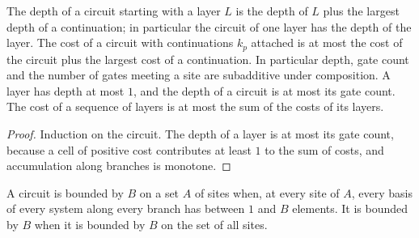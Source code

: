 \begin{theorem}
    \label{thm:circuits_cost_subadditive}
    \leanok
    The depth of a circuit starting with a layer $L$ is the depth of $L$ plus the largest
    depth of a continuation; in particular the circuit of one layer has the depth of the
    layer. The cost of a circuit with continuations $k_p$ attached is at
    most the cost of
    the circuit plus the largest cost of a continuation. In particular depth, gate
    count and the number of gates meeting a site are subadditive under
    composition. A layer has depth at most $1$, and the depth of a circuit is at most
    its gate count. The cost of a
    sequence of layers is at most the sum of the costs of its layers.
\end{theorem}
\begin{proof}\leanok
    Induction on the circuit. The depth of a layer is at most its gate count,
    because a cell of positive cost contributes at least $1$ to the sum of costs,
    and accumulation along branches is monotone.
\end{proof}

\begin{definition}
    \label{def:circuits_dim_bounded}
    \leanok
    A circuit is bounded by $B$ on a set $A$ of sites when, at every site of $A$, every basis of
    every system along every branch has between $1$ and $B$ elements. It is bounded by $B$ when
    it is bounded by $B$ on the set of all sites.
\end{definition}

